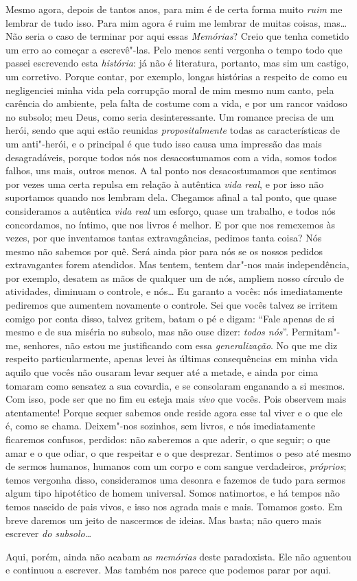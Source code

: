Mesmo agora, depois de tantos anos, para mim é de certa forma muito
\textit{ruim} me lembrar de tudo isso. Para mim agora é ruim me lembrar
de muitas coisas, mas\ldots{} Não seria o caso de terminar por aqui essas
\textit{Memórias}? Creio que tenha cometido um erro ao começar a escrevê"-las.
Pelo menos senti vergonha o tempo todo que passei escrevendo esta
\textit{história}: já não é literatura, portanto, mas sim um castigo,
um corretivo. Porque contar, por exemplo, longas histórias a respeito
de como eu negligenciei minha vida pela corrupção moral de mim mesmo
num canto, pela carência do ambiente, pela falta de costume com a vida,
e por um rancor vaidoso no subsolo; meu Deus, como seria
desinteressante. Um romance precisa de um herói, sendo que aqui estão
reunidas \textit{propositalmente} todas as características de um
anti"-herói, e o principal é que tudo isso causa uma impressão das mais
desagradáveis, porque todos nós nos desacostumamos com a vida, somos
todos falhos, uns mais, outros menos. A tal ponto nos desacostumamos que
sentimos por vezes uma certa repulsa em relação à autêntica \textit{vida
real}, e por isso não suportamos quando nos lembram dela. Chegamos
afinal a tal ponto, que quase consideramos a autêntica \textit{vida real} um
esforço, quase um trabalho, e todos nós concordamos, no íntimo, que nos
livros é melhor. E por que nos remexemos às vezes, por que inventamos
tantas extravagâncias, pedimos tanta coisa? Nós mesmo não sabemos por
quê. Será ainda pior para nós se os nossos pedidos extravagantes forem
atendidos. Mas tentem, tentem dar"-nos mais independência, por exemplo,
desatem as mãos de qualquer um de nós, ampliem nosso círculo de
atividades, diminuam o controle, e nós\ldots{} Eu garanto a vocês: nós
imediatamente pediremos que aumentem novamente o controle. Sei que
vocês talvez se irritem comigo por conta disso, talvez gritem, batam o
pé e digam: ``Fale apenas de si mesmo e de sua miséria no subsolo, mas
não ouse dizer: \textit{todos nós}''. Permitam"-me,
senhores, não estou me justificando com essa \textit{generalização}. No
que me diz respeito particularmente, apenas levei às últimas
consequências em minha vida aquilo que vocês não ousaram levar sequer
até a metade, e ainda por cima tomaram como sensatez a sua covardia, e
se consolaram enganando a si mesmos. Com isso, pode ser que no fim eu
esteja mais \textit{vivo} que vocês. Pois observem mais atentamente! Porque
sequer sabemos onde reside agora esse tal viver e o que ele é, como se
chama. Deixem"-nos sozinhos, sem livros, e nós imediatamente ficaremos
confusos, perdidos: não saberemos a que aderir, o que seguir; o que
amar e o que odiar, o que respeitar e o que desprezar. Sentimos o peso
até mesmo de sermos humanos, humanos com um corpo e com sangue
verdadeiros, \textit{próprios}; temos vergonha disso, consideramos uma
desonra e fazemos de tudo para sermos algum tipo hipotético de homem
universal. Somos natimortos, e há tempos não temos nascido de pais
vivos, e isso nos agrada mais e mais. Tomamos gosto. Em breve daremos
um jeito de nascermos de ideias. Mas basta; não quero mais escrever \textit{do
subsolo}\ldots{}

Aqui, porém, ainda não acabam as \textit{memórias} deste paradoxista. Ele não
aguentou e continuou a escrever. Mas também nos parece que podemos
parar por aqui.


